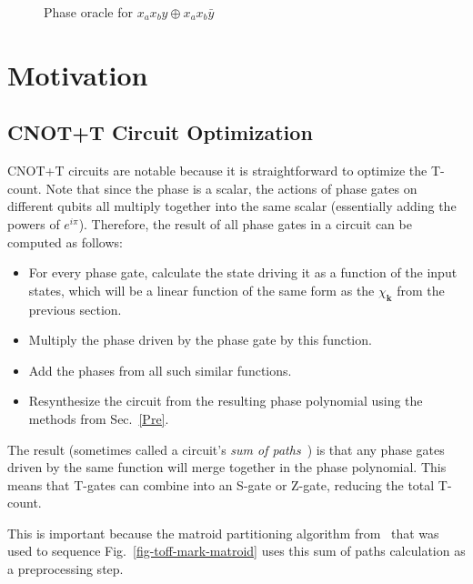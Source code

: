 \begin{figure}[t]
  \scalebox{1.0} {
    
  }
  \scalebox{1.0} {
    
  }
  \caption{Phase oracle for $x_a x_b y \oplus x_a x_b \bar{y}$}
  \label{fig-series-all}
\end{figure}

\section{Motivation}
\label{Mot}
\subsection{CNOT+T Circuit Optimization}
\label{Mot:CnotOpt}
CNOT+T circuits are notable because it is straightforward to optimize the T-count.
Note that since the phase is a scalar, the actions of phase gates on different
qubits all multiply together into the same scalar (essentially adding the powers
of $e^{i \pi}$). Therefore, the result of all phase gates in a circuit
can be computed as follows:

\begin{itemize}
\item For every phase gate, calculate the state driving it as a function of the
  input states, which will be a linear function of the same form as the
  $\chi_{\mathbf{k}}$ from the previous section.
\item Multiply the phase driven by the phase gate by this function.
\item Add the phases from all such similar functions.
\item Resynthesize the circuit from the resulting phase polynomial using
  the methods from Sec.~\ref{Pre}.
\end{itemize}

The result (sometimes called a circuit's {\it sum of paths}~\cite{bib-amy-cnot})
is that any phase gates driven by the same function will merge
together in the phase polynomial. This means that T-gates
can combine into an S-gate or Z-gate, reducing the total T-count.

This is important because the matroid partitioning algorithm from~\cite{bib-amy-matroid}
that was used to sequence Fig.~\ref{fig-toff-mark-matroid} uses this sum of paths
calculation as a preprocessing step. 

